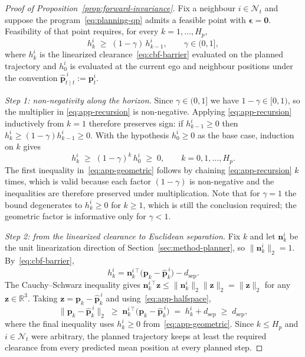 \documentclass[11pt]{article}
\theoremstyle{plain}
\theoremstyle{definition}
\newcommand{\R}{\mathbb{R}}
\begin{document}
\begin{proof}[Proof of Proposition~\ref{prop:forward-invariance}]
	Fix a neighbour $i\in\mathcal{N}_t$ and suppose the
	program~\eqref{eq:planning-qp} admits a feasible point with
	$\bm{\epsilon}=\bm{0}$. Feasibility of that point requires, for
	every $k=1,\dots,H_p$,
	\begin{equation}
		\label{eq:app-recursion}
		h^{i}_{k}\;\geq\;(1-\gamma)\,h^{i}_{k-1},
		\qquad \gamma\in(0,1],
	\end{equation}
	where $h^i_k$ is the linearized clearance~\eqref{eq:cbf-barrier}
	evaluated on the planned trajectory and $h^i_0$ is evaluated at the
	current ego and neighbour positions under the convention
	$\hat{\bm{p}}^{\,i}_{t\mid t}:=\bm{p}^i_t$.

	\emph{Step 1: non-negativity along the horizon.} Since
	$\gamma\in(0,1]$ we have $1-\gamma\in[0,1)$, so the multiplier in
	\eqref{eq:app-recursion} is non-negative. Applying
	\eqref{eq:app-recursion} inductively from $k=1$ therefore preserves
	sign: if $h^i_{k-1}\geq0$ then
	$h^i_k\geq(1-\gamma)h^i_{k-1}\geq0$. With the hypothesis
	$h^i_0\geq0$ as the base case, induction on $k$ gives
	\begin{equation}
		\label{eq:app-geometric}
		h^{i}_{k}\;\geq\;(1-\gamma)^{k}\,h^{i}_{0}\;\geq\;0,
		\qquad k=0,1,\dots,H_p .
	\end{equation}
	The first inequality in~\eqref{eq:app-geometric} follows by chaining
	\eqref{eq:app-recursion} $k$ times, which is valid because each
	factor $(1-\gamma)$ is non-negative and the inequalities are
	therefore preserved under multiplication. Note that for $\gamma=1$
	the bound degenerates to $h^i_k\geq0$ for $k\geq1$, which is still
	the conclusion required; the geometric factor is informative only
	for $\gamma<1$.

	\emph{Step 2: from the linearized clearance to Euclidean
		separation.} Fix $k$ and let
	$\bm{n}^{i}_{k}$ be the unit linearization direction of
	Section~\ref{sec:method-planner}, so
	$\|\bm{n}^{i}_{k}\|_2=1$. By~\eqref{eq:cbf-barrier},
	\begin{equation}
		\label{eq:app-halfspace}
		h^{i}_{k}
		=\bm{n}^{i\,\top}_{k}
		\big(\bm{p}_{k}-\hat{\bm{p}}^{\,i}_{k}\big)
		-d_{\mathrm{sep}} .
	\end{equation}
	The Cauchy--Schwarz inequality gives
	$\bm{n}^{i\,\top}_{k}\bm{z}\leq\|\bm{n}^{i}_{k}\|_2\|\bm{z}\|_2
		=\|\bm{z}\|_2$ for any $\bm{z}\in\R^3$. Taking
	$\bm{z}=\bm{p}_{k}-\hat{\bm{p}}^{\,i}_{k}$ and
	using~\eqref{eq:app-halfspace},
	\begin{equation}
		\big\|\bm{p}_{k}-\hat{\bm{p}}^{\,i}_{k}\big\|_2
		\;\geq\;
		\bm{n}^{i\,\top}_{k}
		\big(\bm{p}_{k}-\hat{\bm{p}}^{\,i}_{k}\big)
		\;=\;
		h^{i}_{k}+d_{\mathrm{sep}}
		\;\geq\;
		d_{\mathrm{sep}},
	\end{equation}
	where the final inequality uses $h^i_k\geq0$
	from~\eqref{eq:app-geometric}. Since $k\leq H_p$ and
	$i\in\mathcal{N}_t$ were arbitrary, the planned trajectory keeps at
	least the required clearance from every predicted mean position at
	every planned step.
\end{proof}
\end{document}
